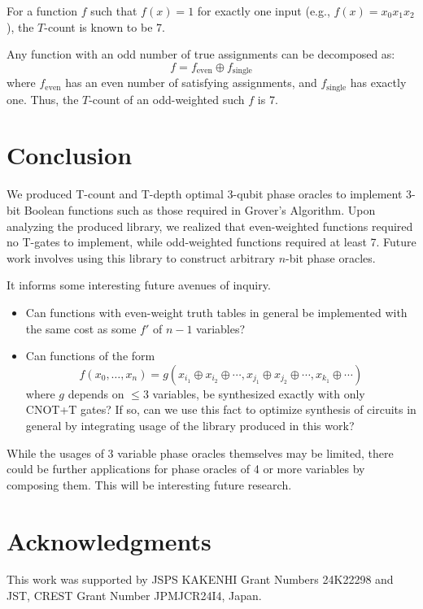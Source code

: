 \documentclass[a4paper]{article}
\begin{document}
\vspace{0.2cm}

For a function $f$ such that $f(x) = 1$ for exactly one input (e.g., $f(x) = x_0 x_1 x_2$), the $T$-count is known to be 7.

\vspace{0.2cm}

Any function with an odd number of true assignments can be decomposed as:
\[
f = f_{\text{even}} \oplus f_{\text{single}}
\]
where $f_{\text{even}}$ has an even number of satisfying assignments, and $f_{\text{single}}$ has exactly one. Thus, the
$T$-count of an odd-weighted such $f$ is 7.

\vspace{0.4cm}

\section{Conclusion}
\label{Sec:concl}

\vspace{0.3cm}

We produced T-count and T-depth optimal 3-qubit phase oracles to implement 3-bit Boolean functions
such as those required in Grover's Algorithm. Upon analyzing the produced library, we realized that
even-weighted functions required no T-gates to implement, while odd-weighted functions required at least 7.
Future work involves using this library to construct arbitrary $n$-bit phase oracles.

\vspace{0.2cm}

It informs some interesting future avenues of inquiry.
\begin{itemize}
  \item Can functions with even-weight truth tables in general be implemented with the same cost as some $f'$ of $n-1$ variables?
  \item Can functions of the form
  \[
  f(x_0,\ldots,x_n) = g(x_{i_1} \oplus x_{i_2} \oplus \cdots, x_{j_1} \oplus x_{j_2} \oplus \cdots, x_{k_1} \oplus \cdots)
  \]
  where $g$ depends on $\leq 3$ variables, be synthesized exactly with only CNOT+T gates? If so, can we use this fact to optimize
  synthesis of circuits in general by integrating usage of the library produced in this work?
\end{itemize}

\vspace{0.3cm}

While the usages of 3 variable phase oracles themselves may be limited, there could be further applications for
phase oracles of 4 or more variables by composing them. This will be interesting future research.

\vspace{0.5cm}

\section*{Acknowledgments}                                                     
This work was supported by JSPS KAKENHI Grant Numbers 24K22298 and JST, CREST Grant Number JPMJCR24I4, Japan.

\vspace{0.5cm}



\end{document}
